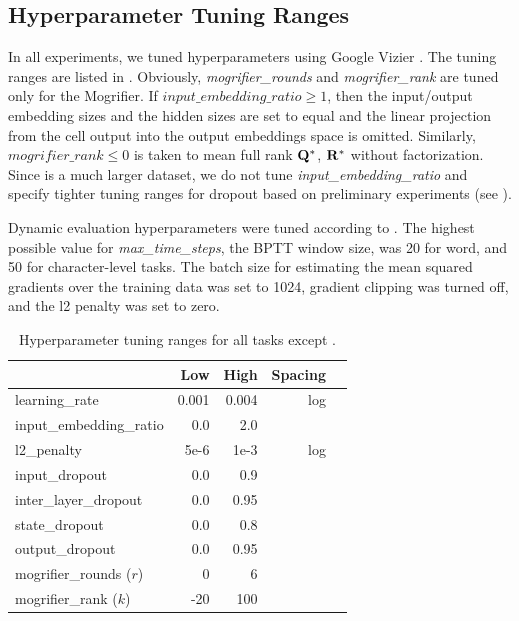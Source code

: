 \begin{subappendices}

\section{Hyperparameter Tuning Ranges}
\label{sec:hyperparameter-tuning-ranges}

In all experiments, we tuned hyperparameters using Google Vizier
\citep{golovin2017google}.
%
The tuning ranges are listed in
.
%
Obviously, \emph{mogrifier\_rounds} and \emph{mogrifier\_rank} are
tuned only for the Mogrifier.
%
If $input\_embedding\_ratio \geqslant 1$, then the input/output
embedding sizes and the hidden sizes are set to equal and the linear
projection from the cell output into the output embeddings space is
omitted.
%
Similarly, $mogrifier\_rank \leqslant 0$ is taken to mean full rank
$\mathbf{Q}^{*}$, $\mathbf{R}^{*}$ without factorization.
%
Since \enwik is a much larger dataset, we do not tune
\emph{input\_embedding\_ratio} and specify tighter tuning ranges for
dropout based on preliminary experiments (see
).

Dynamic evaluation hyperparameters were tuned according to
.
%
The highest possible value for \emph{max\_time\_steps}, the BPTT
window size, was 20 for word, and 50 for character-level tasks.
%
The batch size for estimating the mean squared gradients over the
training data was set to 1024, gradient clipping was turned off, and
the l2 penalty was set to zero.

\begin{table}[tp]
  \caption{Hyperparameter tuning ranges for all tasks except
    \enwik.}
  \label{tab:hyperparameter-tuning-ranges}

  \centering
  \begin{tabular}{@{}lrrrr@{}}
    & Low & High & Spacing \\
    \midrule
    learning\_rate & 0.001 & 0.004 & log \\
    input\_embedding\_ratio & 0.0 & 2.0 & \\
    l2\_penalty & 5e-6 & 1e-3 & log \\
    input\_dropout & 0.0 & 0.9 & \\
    inter\_layer\_dropout & 0.0 & 0.95 & \\
    state\_dropout & 0.0 & 0.8 \\
    output\_dropout & 0.0 & 0.95 \\
    mogrifier\_rounds ($r$) & 0 & 6 \\
    mogrifier\_rank ($k$) & -20 & 100 \\
    \midrule
  \end{tabular}
\end{table}


\end{subappendices}
